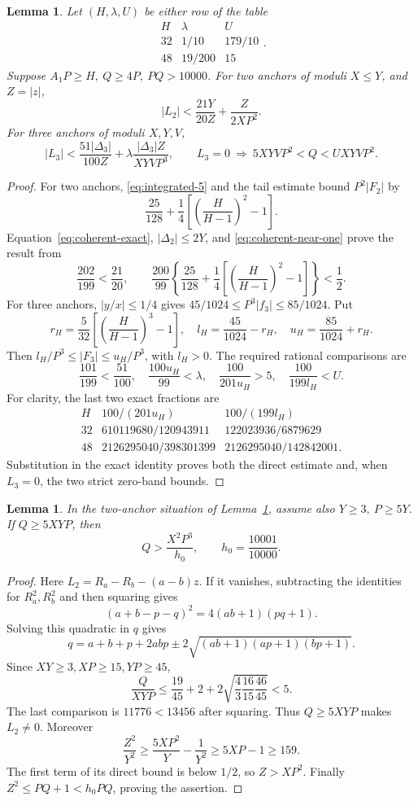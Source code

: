 \documentclass[12pt]{article}
\newtheorem{lemma}[theorem]{Lemma}
\numberwithin{equation}{section}
\begin{document}
\begin{lemma}\label{lem:interpolation-parameters}
Let \((H,\lambda,U)\) be either row of the table
\[
 \begin{array}{c|c|c}
 H&\lambda&U\\\hline
 32&1/10&179/10\\
 48&19/200&15
 \end{array}.
\]
Suppose \(A_1P\ge H,\ Q\ge4P,\ PQ>10000\). For two anchors
of moduli \(X\le Y\), and \(Z=|z|\),
\[
 |L_2|<\frac{21Y}{20Z}+\frac{Z}{2XP^2}.
\]
For three anchors of moduli \(X,Y,V\),
\[
 |L_3|<
 \frac{51|\Delta_3|}{100Z}
 +\lambda\frac{|\Delta_3|Z}{XYV P^3},\qquad
 L_3=0\ \Longrightarrow\
 5XYVP^2<Q<UXYVP^2.
\]
\end{lemma}
\begin{proof}
For two anchors, \eqref{eq:integrated-5} and the tail estimate bound \(P^2|F_2|\) by
\[
 \frac{25}{128}+\frac14\left[\left(\frac{H}{H-1}\right)^2-1\right].
\]
Equation~\eqref{eq:coherent-exact}, \(|\Delta_2|\le2Y\), and
\eqref{eq:coherent-near-one} prove the result from
\[
 \frac{202}{199}<\frac{21}{20},\qquad
 \frac{200}{99}\left\{\frac{25}{128}
 +\frac14\left[\left(\frac{H}{H-1}\right)^2-1\right]\right\}<\frac12.
\]
For three anchors, \(|y/x|\le1/4\) gives
\(45/1024\le P^3|f_3|\le85/1024\). Put
\[
 r_H=\frac5{32}\left[\left(\frac{H}{H-1}\right)^3-1\right],
 \quad l_H=\frac{45}{1024}-r_H,\quad
 u_H=\frac{85}{1024}+r_H.
\]
Then \(l_H/P^3\le|F_3|\le u_H/P^3\), with \(l_H>0\).
The required rational comparisons are
\[
 \frac{101}{199}<\frac{51}{100},\quad
 \frac{100u_H}{99}<\lambda,\quad
 \frac{100}{201u_H}>5,\quad
 \frac{100}{199l_H}<U.
\]
For clarity, the last two exact fractions are
\[
 \begin{array}{c|cc}
 H&100/(201u_H)&100/(199l_H)\\\hline
 32&610119680/120943911&122023936/6879629\\
 48&2126295040/398301399&2126295040/142842001 .
 \end{array}
\]
Substitution in the exact identity proves both the direct estimate and,
when \(L_3=0\), the two strict zero-band bounds.
\end{proof}

\begin{lemma}\label{lem:strong-two-anchor}
In the two-anchor situation of Lemma~\ref{lem:interpolation-parameters},
assume also \(Y\ge3,\ P\ge5Y\). If \(Q\ge5XYP\), then
\[
 Q>\frac{X^2P^3}{h_0},\qquad h_0=\frac{10001}{10000}.
\]
\end{lemma}
\begin{proof}
Here \(L_2=R_a-R_b-(a-b)z\). If it vanishes, subtracting the identities
for \(R_a^2,R_b^2\) and then squaring gives
\[
 (a+b-p-q)^2=4(ab+1)(pq+1).
\]
Solving this quadratic in \(q\) gives
\[
 q=a+b+p+2abp\pm2\sqrt{(ab+1)(ap+1)(bp+1)}.
\]
Since \(XY\ge3,XP\ge15,YP\ge45\),
\[
 \frac{Q}{XYP}\le\frac{19}{45}+2+
             2\sqrt{\frac43\frac{16}{15}\frac{46}{45}}<5.
\]
The last comparison is \(11776<13456\) after squaring.
Thus \(Q\ge5XYP\) makes \(L_2\ne0\). Moreover
\[
 \frac{Z^2}{Y^2}\ge\frac{5XP^2}{Y}-\frac1{Y^2}
 \ge5XP-1\ge159.
\]
The first term of its direct bound is below \(1/2\), so \(Z>XP^2\).
Finally \(Z^2\le PQ+1<h_0PQ\), proving the assertion.
\end{proof}
\end{document}
